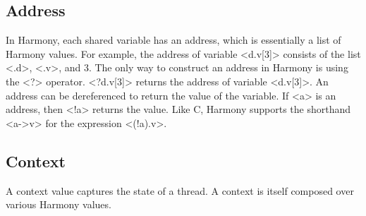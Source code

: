 \documentclass{report}
\begin{document}
{\subsection*{Address}

In Harmony, each shared variable has an address, which is essentially
a list of Harmony values.
For example, the address of variable <{d.v[3]}> consists of the
list <{.d}>, <{.v}>, and 3.  The only way to construct an
address in Harmony is using the <{?}> operator.
<{?d.v[3]}> returns the address of variable <{d.v[3]}>.
An address can be dereferenced to return the value of the variable.
If <{a}> is an address, then <{!a}> returns the value.
Like C, Harmony supports the shorthand <{a->v}> for the expression <{(!a).v}>.

\subsection*{Context}

A context value captures the state of a thread.
A context is itself composed over various Harmony values.

}
\end{document}
